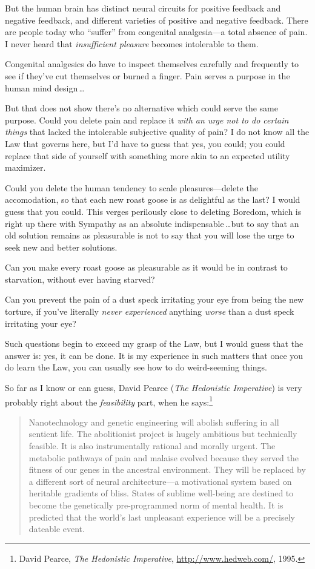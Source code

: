  But the human brain has distinct neural circuits for positive
feedback and negative feedback, and different varieties of positive and
negative feedback. There are people today who
``suffer'' from congenital
analgesia---a total absence of pain. I never heard that
\textit{insufficient pleasure} becomes intolerable to them.


 Congenital analgesics do have to inspect themselves carefully and
frequently to see if they've cut themselves or burned a
finger. Pain serves a purpose in the human mind design\,\ldots


 But that does not show there's no alternative
which could serve the same purpose. Could you delete pain and replace
it \textit{with an urge not to do certain things} that lacked the
intolerable subjective quality of pain? I do not know all the Law that
governs here, but I'd have to guess that yes, you
could; you could replace that side of yourself with something more akin
to an expected utility maximizer.


 Could you delete the human tendency to scale pleasures---delete
the accomodation, so that each new roast goose is as delightful as the
last? I would guess that you could. This verges perilously close to
deleting Boredom, which is right up there with Sympathy as an absolute
indispensable\,\ldots but to say that an old solution remains as
pleasurable is not to say that you will lose the urge to seek new and
better solutions.


 Can you make every roast goose as pleasurable as it would be in
contrast to starvation, without ever having starved?


 Can you prevent the pain of a dust speck irritating your eye from
being the new torture, if you've literally
\textit{never experienced} anything \textit{worse} than a dust speck
irritating your eye?


 Such questions begin to exceed my grasp of the Law, but I would
guess that the answer is: yes, it can be done. It is my experience in
such matters that once you do learn the Law, you can usually see how to
do weird-seeming things.

{
 So far as I know or can guess, David Pearce (\textit{The
Hedonistic Imperative}) is very probably right about the
\textit{feasibility} part, when he says:\footnote{David Pearce, \textit{The Hedonistic Imperative},
\url{http://www.hedweb.com/}, 1995.}}

\begin{quote}
{
 Nanotechnology and genetic engineering will abolish suffering in
all sentient life. The abolitionist project is hugely ambitious but
technically feasible. It is also instrumentally rational and morally
urgent. The metabolic pathways of pain and malaise evolved because they
served the fitness of our genes in the ancestral environment. They will
be replaced by a different sort of neural architecture---a motivational
system based on heritable gradients of bliss. States of sublime
well-being are destined to become the genetically pre-programmed norm
of mental health. It is predicted that the world's last
unpleasant experience will be a precisely dateable event.}
\end{quote}


